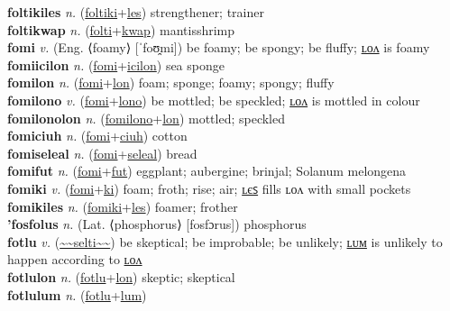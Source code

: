 \textbf{foltikiles} \textit{n.} (\hyperref[foltiki]{foltiki}+\hyperref[les]{les})
strengthener; trainer \label{foltikiles} \\
\textbf{foltikwap} \textit{n.} (\hyperref[folti]{folti}+\hyperref[kwap]{kwap})
mantisshrimp \label{foltikwap} \\
\textbf{fomi} \textit{v.} (Eng. ⟨foamy⟩ [ˈfoʊ̯mi])
be foamy; be spongy; be fluffy; \hyperref[fomilon]{ʟᴏᴧ} is foamy \label{fomi} \\
\textbf{fomiicilon} \textit{n.} (\hyperref[fomi]{fomi}+\hyperref[icilon]{icilon})
sea sponge \label{fomiicilon} \\
\textbf{fomilon} \textit{n.} (\hyperref[fomi]{fomi}+\hyperref[lon]{lon})
foam; sponge; foamy; spongy; fluffy \label{fomilon} \\
\textbf{fomilono} \textit{v.} (\hyperref[fomi]{fomi}+\hyperref[lono]{lono})
be mottled; be speckled; \hyperref[fomilonolon]{ʟᴏᴧ} is mottled in colour \label{fomilono} \\
\textbf{fomilonolon} \textit{n.} (\hyperref[fomilono]{fomilono}+\hyperref[lon]{lon})
mottled; speckled \label{fomilonolon} \\
\textbf{fomiciuh} \textit{n.} (\hyperref[fomi]{fomi}+\hyperref[ciuh]{ciuh})
cotton \label{fomiciuh} \\
\textbf{fomiseleal} \textit{n.} (\hyperref[fomi]{fomi}+\hyperref[seleal]{seleal})
bread \label{fomiseleal} \\
\textbf{fomifut} \textit{n.} (\hyperref[fomi]{fomi}+\hyperref[fut]{fut})
eggplant; aubergine; brinjal; Solanum melongena \label{fomifut} \\
\textbf{fomiki} \textit{v.} (\hyperref[fomi]{fomi}+\hyperref[ki]{ki})
foam; froth; rise; air; \hyperref[fomikiles]{ʟєꜱ} fills ʟᴏᴧ with small pockets \label{fomiki} \\
\textbf{fomikiles} \textit{n.} (\hyperref[fomiki]{fomiki}+\hyperref[les]{les})
foamer; frother \label{fomikiles} \\
\textbf{'fosfolus} \textit{n.} (Lat. ⟨phosphorus⟩ [fosfɔrus])
phosphorus \label{'fosfolus} \\
\textbf{fotlu} \textit{v.} (\hyperref[selti]{\~{}\~{}selti\~{}\~{}})
be skeptical; be improbable; be unlikely; \hyperref[fotlulum]{ʟᴜᴍ} is unlikely to happen according to \hyperref[fotlulon]{ʟᴏᴧ} \label{fotlu} \\
\textbf{fotlulon} \textit{n.} (\hyperref[fotlu]{fotlu}+\hyperref[lon]{lon})
skeptic; skeptical \label{fotlulon} \\
\textbf{fotlulum} \textit{n.} (\hyperref[fotlu]{fotlu}+\hyperref[lum]{lum})
